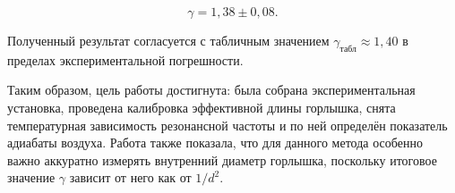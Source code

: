 \documentclass[12pt]{extreport}
\begin{document}
	\begin{equation*}
		\boxed{\gamma = 1,38 \pm 0,08.}
	\end{equation*}
	
	Полученный результат согласуется с табличным значением \(\gamma_{\text{табл}}\approx1,40\) в пределах экспериментальной погрешности.
	
	Таким образом, цель работы достигнута: была собрана экспериментальная установка, проведена калибровка эффективной длины горлышка, снята температурная зависимость резонансной частоты и по ней определён показатель адиабаты воздуха. Работа также показала, что для данного метода особенно важно аккуратно измерять внутренний диаметр горлышка, поскольку итоговое значение \(\gamma\) зависит от него как от \(1/d^2\).
	
	
\end{document}
